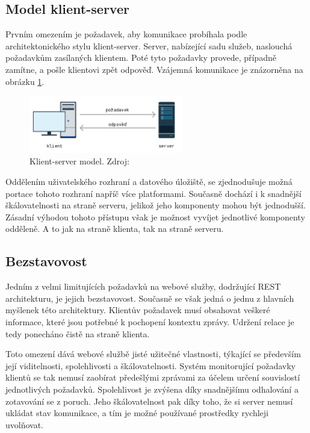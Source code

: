 \subsection*{Model klient-server}
\label{subsec_ModelKlientServer}

Prvním omezením je požadavek, aby komunikace probíhala podle architektonického stylu klient-server. Server, nabízející sadu služeb, naslouchá požadavkům zasílaných klientem. Poté tyto požadavky provede, případně zamítne, a pošle klientovi zpět odpověď. Vzájemná komunikace je znázorněna na obrázku \ref{fig_KlientServerModel}. 

\begin{figure}[hbt]
	\centering
	\includegraphics[width=0.6\textwidth]{obrazky-figures/Klient-server.png}
	\caption{Klient-server model. Zdroj: \cite{Schmidl}}
	\label{fig_KlientServerModel}
\end{figure}

Oddělením uživatelského rozhraní a datového úložiště, se zjednodušuje možná portace tohoto rozhraní napříč více platformami. Současně dochází i k snadnější škálovatelnosti na straně serveru, jelikož jeho komponenty mohou být jednodušší. Zásadní výhodou tohoto přístupu však je možnost vyvíjet jednotlivé komponenty odděleně. A to jak na straně klienta, tak na straně serveru.\cite{Roy} 


\subsection*{Bezstavovost}
\label{subsec_Bezstavovost}

Jedním z velmi limitujících požadavků na webové služby, dodržující REST architekturu, je jejich bezstavovost. Současně se však jedná o jednu z hlavních myšlenek této architektury. Klientův požadavek musí obsahovat veškeré informace, které jsou potřebné k pochopení kontextu zprávy. Udržení relace je tedy ponecháno čistě na straně klienta.

Toto omezení dává webové službě jisté užitečné vlastnosti, týkající se především její viditelnosti, spolehlivosti a škálovatelnosti. Systém monitorující požadavky klientů se tak nemusí zaobírat předešlými zprávami za účelem určení souvislostí jednotlivých požadavků. Spolehlivost je zvýšena díky snadnějšímu odhalování a zotavování se z poruch. Jeho škálovatelnost pak díky toho, že si server nemusí ukládat stav komunikace, a tím je možné používané prostředky rychleji uvolňovat.\cite{Roy}

